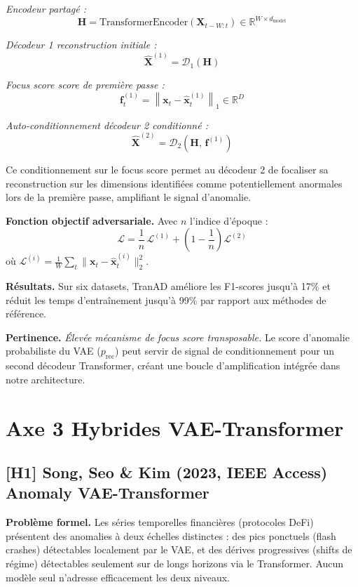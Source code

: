 \documentclass[12pt,a4paper]{article}
\begin{document}
\textit{Encodeur partagé :}
$$\mathbf{H} = \mathrm{TransformerEncoder}(\mathbf{X}_{t-W:t}) \in \mathbb{R}^{W \times d_{\mathrm{model}}}$$

\textit{Décodeur 1  reconstruction initiale :}
$$\hat{\mathbf{X}}^{(1)} = \mathcal{D}_1(\mathbf{H})$$

\textit{Focus score  score de première passe :}
$$\mathbf{f}^{(1)}_t = \left\|\mathbf{x}_t - \hat{\mathbf{x}}^{(1)}_t\right\|_1 \in \mathbb{R}^D$$

\textit{Auto-conditionnement  décodeur 2 conditionné :}
$$\hat{\mathbf{X}}^{(2)} = \mathcal{D}_2(\mathbf{H},\,\mathbf{f}^{(1)})$$

Ce conditionnement sur le focus score permet au décodeur 2 de focaliser sa reconstruction sur les dimensions identifiées comme potentiellement anormales lors de la première passe, amplifiant le signal d'anomalie.

\textbf{Fonction objectif adversariale.} Avec $n$ l'indice d'époque :
$$\mathcal{L} = \frac{1}{n}\,\mathcal{L}^{(1)} + \left(1 - \frac{1}{n}\right)\mathcal{L}^{(2)}$$
où $\mathcal{L}^{(i)} = \frac{1}{W}\sum_t\|\mathbf{x}_t - \hat{\mathbf{x}}^{(i)}_t\|_2^2$.

\textbf{Résultats.} Sur six datasets, TranAD améliore les F1-scores jusqu'à 17\% et réduit les temps d'entraînement jusqu'à 99\% par rapport aux méthodes de référence.

\textbf{Pertinence.} \textit{Élevée  mécanisme de focus score transposable.} Le score d'anomalie probabiliste du VAE ($p_{\mathrm{rec}}$) peut servir de signal de conditionnement pour un second décodeur Transformer, créant une boucle d'amplification intégrée dans notre architecture.

\section{Axe 3 Hybrides VAE-Transformer}

\subsection{[H1] Song, Seo \& Kim (2023, IEEE Access)  Anomaly VAE-Transformer}

\textbf{Problème formel.} Les séries temporelles financières (protocoles DeFi) présentent des anomalies à deux échelles distinctes : des pics ponctuels (flash crashes) détectables localement par le VAE, et des dérives progressives (shifts de régime) détectables seulement sur de longs horizons via le Transformer. Aucun modèle seul n'adresse efficacement les deux niveaux.
\end{document}
